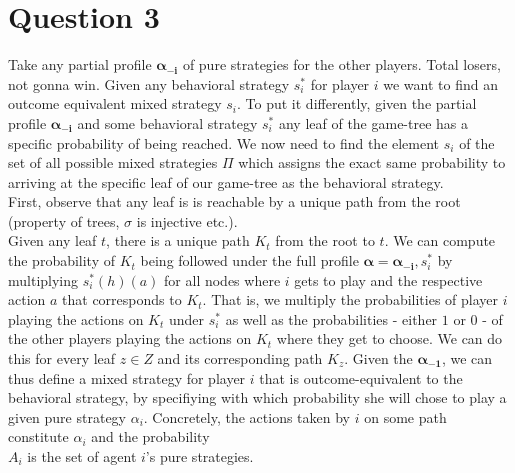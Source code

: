 \documentclass[10pt,a4paper]{article}
\begin{document}
\section*{Question 3}
Take any partial profile $\bm{\alpha_{-i}}$ of pure strategies for the other players. Total losers, not gonna win. Given any behavioral strategy $s_i^*$ for player $i$ we want to find an outcome equivalent mixed strategy $s_i$. To put it differently, given the partial profile $\bm{\alpha_{-i}}$ and some behavioral strategy $s_i^*$ any leaf of the game-tree has a specific probability of being reached. We now need to find the element $s_i$ of the set of all possible mixed strategies $\Pi$ which assigns the exact same probability to arriving at the specific leaf of our game-tree as the behavioral strategy.\\
First, observe that any leaf is is reachable by a unique path from the root (property of trees, $\sigma$ is injective etc.).\\
Given any leaf $t$, there is a unique path $K_t$ from the root to $t$. We can compute the probability of $K_t$ being followed under the full profile $\bm{\alpha}=\bm{\alpha_{-i}},s_i^*$ by multiplying $s_i^*(h)(a)$ for all nodes where $i$ gets to play and the respective action $a$ that corresponds to $K_t$. That is, we multiply the probabilities of player $i$ playing the actions on $K_t$ under $s_i^*$ as well as the probabilities - either $1$ or $0$ - of the other players playing the actions on $K_t$ where they get to choose. We can do this for every leaf $z\in Z$ and its corresponding path $K_z$. Given the $\bm{\alpha_{-1}}$, we can thus define a mixed strategy for player $i$ that is outcome-equivalent to the behavioral strategy, by specifiying with which probability she will chose to play a given pure strategy $\alpha_i$. Concretely, the actions taken by $i$ on some path constitute $\alpha_i$ and the probability \\

$A_i$ is the set of agent $i$'s pure strategies.\\
\end{document}
